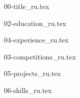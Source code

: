 \documentclass[letterpaper,11pt]{article}
\begin{document}

{00-title_ru.tex}


{02-education_ru.tex}


{04-experience_ru.tex}

{03-competitions_ru.tex}

{05-projects_ru.tex}


{06-skills_ru.tex}



\vfill
{}
\end{document}
